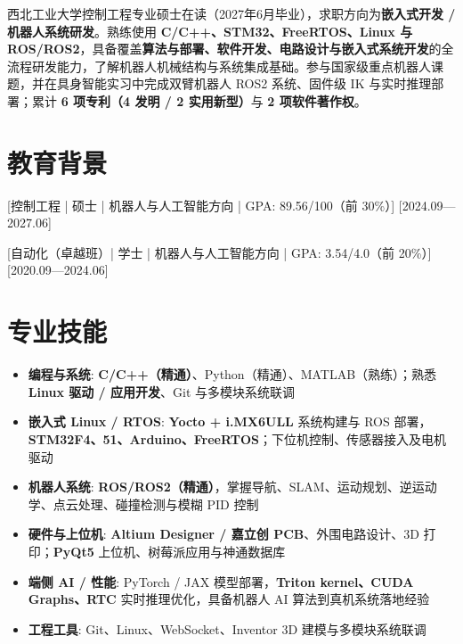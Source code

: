 \documentclass{resume-photo}
\newcommand{\hl}[1]{\textbf{\textcolor{hlred}{#1}}}
\begin{document}

\ResumeTitle

\noindent 西北工业大学控制工程专业硕士在读（2027年6月毕业），求职方向为\hl{嵌入式开发 / 机器人系统研发}。熟练使用 \hl{C/C++、STM32、FreeRTOS、Linux 与 ROS/ROS2}，具备覆盖\hl{算法与部署、软件开发、电路设计与嵌入式系统开发}的全流程研发能力，了解机器人机械结构与系统集成基础。参与国家级重点机器人课题，并在具身智能实习中完成双臂机器人 ROS2 系统、固件级 IK 与实时推理部署；累计 \hl{6 项专利（4 发明 / 2 实用新型）}与 \hl{2 项软件著作权}。

\section{教育背景}
\ResumeItem{西北工业大学\hl{（985）}}
[\textnormal{控制工程 | 硕士 | 机器人与人工智能方向 | GPA: 89.56/100（前 30\%）}]
[2024.09—2027.06]

\ResumeItem{郑州大学\hl{（211）}}
[\textnormal{自动化（卓越班）| 学士 | 机器人与人工智能方向 | GPA: 3.54/4.0（前 20\%）}]
[2020.09—2024.06]

\section{专业技能}
\begin{itemize}
  \item \textbf{编程与系统}: \hl{C/C++（精通）}、Python（精通）、MATLAB（熟练）；熟悉 \hl{Linux 驱动 / 应用开发}、Git 与多模块系统联调
  \item \textbf{嵌入式 Linux / RTOS}: \hl{Yocto + i.MX6ULL} 系统构建与 ROS 部署，\hl{STM32F4、51、Arduino、FreeRTOS}；下位机控制、传感器接入及电机驱动
  \item \textbf{机器人系统}: \hl{ROS/ROS2（精通）}，掌握导航、SLAM、运动规划、逆运动学、点云处理、碰撞检测与模糊 PID 控制
  \item \textbf{硬件与上位机}: \hl{Altium Designer / 嘉立创 PCB}、外围电路设计、3D 打印；\hl{PyQt5} 上位机、树莓派应用与神通数据库
  \item \textbf{端侧 AI / 性能}: PyTorch / JAX 模型部署，\hl{Triton kernel、CUDA Graphs、RTC} 实时推理优化，具备机器人 AI 算法到真机系统落地经验
  \item \textbf{工程工具}: Git、Linux、WebSocket、Inventor 3D 建模与多模块系统联调
\end{itemize}
\end{document}
